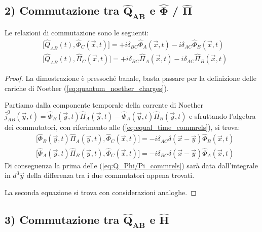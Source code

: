 \documentclass[../main.tex]{subfiles}
\begin{document}
\subsection[Commutazione $\hat{Q}_{AB}$ - $\hat{\Phi}$ / $\hat{\Pi}$]{2) Commutazione tra $\hat{\mathbf{Q}}_{\mathbf{AB}}$ e $\hat{\mathbf{\Phi}}$ / $\hat{\mathbf{\Pi}}$}
Le relazioni di commutazione sono le seguenti:
\begin{equation}
    \boxed{
    \begin{aligned}
        & \big[ \hat{Q}_{AB}(t), \hat{\Phi}_C(\Vec{x}, t) \big] = +i\delta_{BC}\hat{\Phi}_A(\Vec{x}, t) - i\delta_{AC}\hat{\Phi}_B(\Vec{x}, t) \\
        & \big[ \hat{Q}_{AB}(t), \hat{\Pi}_C(\Vec{x}, t) \big] = +i\delta_{BC}\hat{\Pi}_A(\Vec{x}, t) - i\delta_{AC}\hat{\Pi}_B(\Vec{x}, t)
    \end{aligned}}
    \label{eq:Q_Phi/Pi_commrels}
\end{equation}
\begin{proof}
    La dimostrazione è pressoché banale, basta passare per la definizione delle cariche di Noether (\ref{eq:quantum_noether_charges}).
    
    Partiamo dalla componente temporale della corrente di Noether \(\hat{j}^0_{AB}(\Vec{y}, t) = \hat{\Phi}_B(\Vec{y}, t)\hat{\Pi}_A(\Vec{y}, t) - \hat{\Phi}_A(\Vec{y}, t)\hat{\Pi}_B(\Vec{y}, t)\) e sfruttando l'algebra dei commutatori, con riferimento alle (\ref{eq:equal_time_commrels}), si trova:
    \begin{align*}
        & \big[ \hat{\Phi}_B(\Vec{y}, t)\hat{\Pi}_A(\Vec{y}, t), \hat{\Phi}_C(\Vec{x}, t) \big] = -i\delta_{AC}\delta(\Vec{x}-\Vec{y})\hat{\Phi}_B(\Vec{x}, t) \\
        & \big[ \hat{\Phi}_A(\Vec{y}, t)\hat{\Pi}_B(\Vec{y}, t), \hat{\Phi}_C(\Vec{x}, t) \big] = -i\delta_{BC}\delta(\Vec{x}-\Vec{y})\hat{\Phi}_A(\Vec{x}, t)
    \end{align*}
    Di conseguenza la prima delle (\ref{eq:Q_Phi/Pi_commrels}) sarà data dall'integrale in $d^3\Vec{y}$ della differenza tra i due commutatori appena trovati.

    La seconda equazione si trova con considerazioni analoghe.
\end{proof}

\subsection[Commutazione $\hat{Q}_{AB}$ - $\hat{H}$]{3) Commutazione tra $\hat{\mathbf{Q}}_{\mathbf{AB}}$ e $\hat{\mathbf{H}}$}
\end{document}
